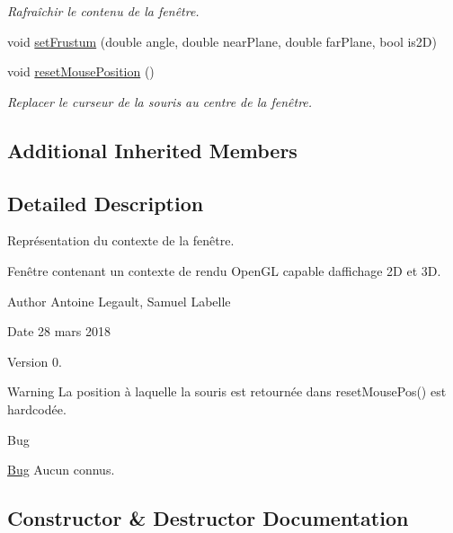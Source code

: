 \begin{DoxyCompactItemize}
\begin{DoxyCompactList}\small\item\em Rafraîchir le contenu de la fenêtre. \end{DoxyCompactList}\item 
void \hyperlink{class_g_l_context_a34ff8c32f759b592b093f22547d4564f}{set\+Frustum} (double angle, double near\+Plane, double far\+Plane, bool is2\+D)
\item 
\hypertarget{class_g_l_context_a593755ff1b774418e2b47243f5c66790}{}void \hyperlink{class_g_l_context_a593755ff1b774418e2b47243f5c66790}{reset\+Mouse\+Position} ()\label{class_g_l_context_a593755ff1b774418e2b47243f5c66790}

\begin{DoxyCompactList}\small\item\em Replacer le curseur de la souris au centre de la fenêtre. \end{DoxyCompactList}\end{DoxyCompactItemize}
\subsection*{Additional Inherited Members}


\subsection{Detailed Description}
Représentation du contexte de la fenêtre. 

Fenêtre contenant un contexte de rendu Open\+G\+L capable d\textquotesingle{}affichage 2\+D et 3\+D. \begin{DoxyAuthor}{Author}
Antoine Legault, Samuel Labelle 
\end{DoxyAuthor}
\begin{DoxyDate}{Date}
28 mars 2018 
\end{DoxyDate}
\begin{DoxyVersion}{Version}
0. 
\end{DoxyVersion}
\begin{DoxyWarning}{Warning}
La position à laquelle la souris est retournée dans reset\+Mouse\+Pos() est hardcodée. 
\end{DoxyWarning}
\begin{DoxyRefDesc}{Bug}
\item[\hyperlink{bug__bug000003}{Bug}]Aucun connus. \end{DoxyRefDesc}


\subsection{Constructor \& Destructor Documentation}
\hypertarget{class_g_l_context_a7fcab81e563e8dd533a1950b1aa45067}{}
